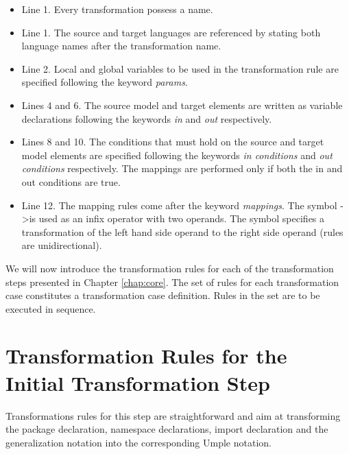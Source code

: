 \begin{itemize}

\item Line 1. Every transformation possess a name.

\item Line 1. The source and target languages are referenced by stating both language names after the transformation name.

\item Line 2. Local and global variables to be used in the transformation rule are specified following the keyword \textit{params}.

\item Lines 4 and 6. The source model and target elements are written as variable declarations following the keywords \textit{in} and \textit{out} respectively.

\item Lines 8 and 10. The conditions that must hold on the source and target model elements are specified following the keywords \textit{in conditions} and \textit{out conditions} respectively. The mappings are performed only if both the in and out conditions are true. 

\item Line 12. The mapping rules come after the keyword \textit{mappings}. The symbol -\textgreater  is used as an infix operator with two operands. The symbol specifies a transformation of the left hand side operand to the right side operand (rules are unidirectional).
\end{itemize}

We will now introduce the transformation rules for each of the transformation steps presented in Chapter \ref{chap:core}.
The set of rules for each transformation case constitutes a transformation case definition. Rules in the set are to be executed in sequence.

\section{Transformation Rules for the Initial Transformation Step}

Transformations rules for this step are straightforward and aim at transforming the package declaration, namespace declarations, import declaration and the generalization notation into the corresponding Umple notation. 

